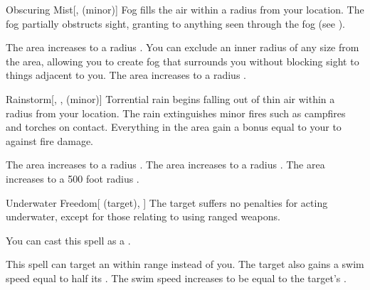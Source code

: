 \lowercase{\hypertarget{spell:Obscuring Mist}{}}\label{spell:Obscuring Mist}
\begin{freeability}[Rank 2]{\hypertarget{spell:Obscuring Mist}{Obscuring Mist}}[,  (minor)]
\targetrule
Fog fills the air within a \areamed radius  from your location.
The fog partially obstructs sight, granting  to anything seen through the fog (see ).

\rankline
{} The area increases to a \arealarge radius .
 You can exclude an inner radius of any size from the area, allowing you to create fog that surrounds you without blocking sight to things adjacent to you.
 The area increases to a \areahuge radius .

\end{freeability}
\vspace{0.25em}



\lowercase{\hypertarget{spell:Rainstorm}{}}\label{spell:Rainstorm}
\begin{freeability}[Rank 2]{\hypertarget{spell:Rainstorm}{Rainstorm}}[, ,  (minor)]
Torrential rain begins falling out of thin air within a \arealarge radius  from your location.
The rain extinguishes minor fires such as campfires and torches on contact.
Everything in the area gain a bonus equal to your  to  against fire damage.

\rankline
{} The area increases to a \areahuge radius .
 The area increases to a \areaext radius .
 The area increases to a 500 foot radius .

\end{freeability}
\vspace{0.25em}



\lowercase{\hypertarget{spell:Underwater Freedom}{}}\label{spell:Underwater Freedom}
\begin{attuneability}[Rank 2]{\hypertarget{spell:Underwater Freedom}{Underwater Freedom}}[ (target), ]
The target suffers no penalties for acting underwater, except for those relating to using ranged weapons.

You can cast this spell as a .

\rankline
{} This spell can target an  within \rngmed range instead of you.
 The target also gains a swim speed equal to half its .
 The swim speed increases to be equal to the target's .

\end{attuneability}
\vspace{0.25em}



